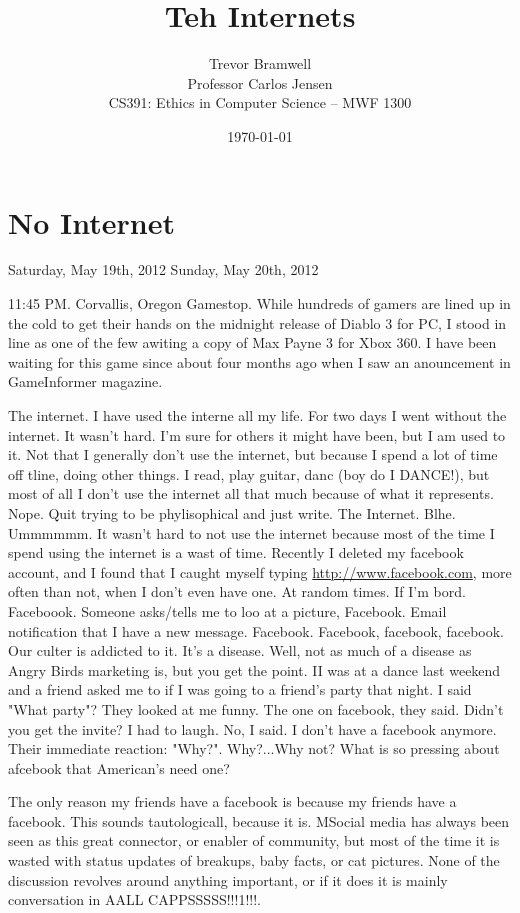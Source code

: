 \documentclass[12pt,letterpaper]{article}
\title{Teh Internets}
\author{
    Trevor Bramwell\\
    Professor Carlos Jensen\\
    CS391: Ethics in Computer Science -- MWF 1300\\
}
\date{\today}
\begin{document}
\maketitle




\section{No Internet}
Saturday, May 19th, 2012
Sunday, May 20th, 2012

11:45 PM. Corvallis, Oregon Gamestop. While hundreds of gamers are lined up
in the cold to get their hands on the midnight release of Diablo 3 for
PC, I stood in line as one of the few awiting a copy of Max Payne 3 for
Xbox 360. I have been waiting for this game since about four months ago
when I saw an anouncement in GameInformer magazine. 





The internet. I have used the interne all my life. For two days I went
without the internet. It wasn't hard. I'm sure for others it might have
been, but I am used to it. Not that I generally don't use the internet,
but because I spend a lot of time off tline, doing other things. I read,
play guitar, danc (boy do I DANCE!), but most of all I don't use the
internet all that much because of what it represents. Nope. Quit trying
to be phylisophical and just write. The Internet. Blhe. Ummmmmm. It
wasn't hard to not use the internet because most of the time I spend
using the internet is a wast of time. Recently I deleted my facebook
account, and I found that I caught myself typing \url{http://www.facebook.com}, more
often than not, when I don't even have one. At random times. If I'm
bord. Faceboook. Someone asks/tells me to loo at a picture, Facebook.
Email notification that I have a new message. Facebook. Facebook,
facebook, facebook. Our culter is addicted to it. It's a disease. Well,
not as much of a disease as Angry Birds marketing is, but you get the
point. II was at a dance last weekend and a friend asked me to if I was
going to a friend's party that night. I said "What party"? They looked
at me funny. The one on facebook, they said. Didn't you get the invite?
I had to laugh. No, I said. I don't have a facebook anymore. Their
immediate reaction: "Why?". Why?...Why not? What is so pressing about
afcebook that American's need one? 

The only reason my friends have a facebook is because my friends have a
facebook. This sounds tautologicall, because it is. MSocial media has
always been seen as this great connector, or enabler of community, but
most of the time it is wasted  with status updates of breakups, baby
facts, or cat pictures. None of the discussion revolves around anything
important, or if it does it is mainly conversation in AALL
CAPPSSSSS!!!1!!!.
\end{document}
